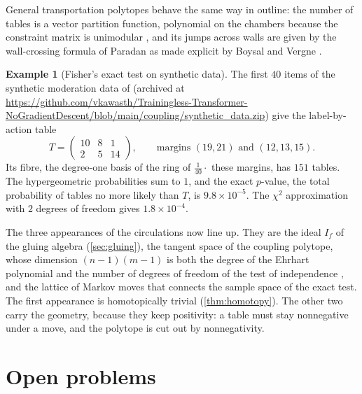 \documentclass[11pt]{article}
\theoremstyle{definition}
\newtheorem{example}[theorem]{Example}
\theoremstyle{remark}
\begin{document}
General transportation polytopes behave the same way in outline: the number of tables is a vector partition function,
polynomial on the chambers because the constraint matrix is unimodular \cite{Sturmfels1995}, and its jumps across walls are
given by the wall-crossing formula of Paradan as made explicit by Boysal and Vergne \cite{BoysalVergne2009}.

\begin{example}[Fisher's exact test on synthetic data]\label{ex:fisher}
The first $40$ items of the synthetic moderation data of \cite[\S12]{Conditionals} (archived at \url{https://github.com/vkawasth/Trainingless-Transformer-NoGradientDescent/blob/main/coupling/synthetic_data.zip}) give the label-by-action table
\[
T=\begin{pmatrix}10&8&1\\2&5&14\end{pmatrix},\qquad\text{margins }(19,21)\text{ and }(12,13,15).
\]
Its fibre, the degree-one basis of the ring of $\frac1{40}\cdot$ these margins, has $151$ tables. The hypergeometric probabilities sum
to $1$, and the exact $p$-value, the total probability of tables no more likely than $T$, is $9.8\times10^{-5}$. The
$\chi^2$ approximation with $2$ degrees of freedom gives $1.8\times10^{-4}$.
\end{example}

The three appearances of the circulations now line up. They are the ideal $I_f$ of the gluing algebra (\cref{sec:gluing}),
the tangent space of the coupling polytope, whose dimension $(n-1)(m-1)$ is both the degree of the Ehrhart polynomial and
the number of degrees of freedom of the test of independence \cite[Prop.~12.1]{Conditionals}, and the lattice of Markov moves
that connects the sample space of the exact test. The first appearance is homotopically trivial (\cref{thm:homotopy}). The
other two carry the geometry, because they keep positivity: a table must stay nonnegative under a move, and the polytope
is cut out by nonnegativity.

\section{Open problems}\label{sec:open}
\end{document}
